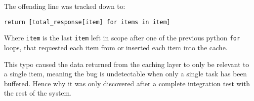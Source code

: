 The offending line was tracked down to:

\verb`return [total_response[item] for items in item]`

Where \verb`item` is the last \verb`item` left in scope after one of the previous python \verb`for` loops, that requested each item from or inserted each item into the cache.

This typo caused the data returned from the caching layer to only be relevant to a single item, meaning the bug is undetectable when only a single task has been buffered. Hence why it was only discovered after a complete integration test with the rest of the system.

